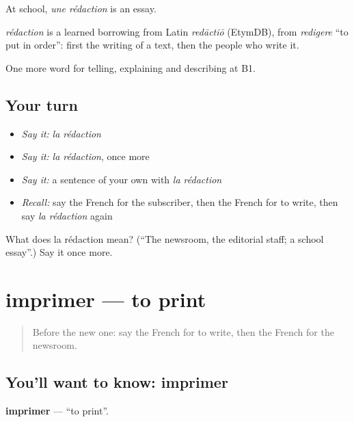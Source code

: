 At school, \emph{une rédaction} is an essay.

\begin{cousinweb}
\emph{rédaction} is a learned borrowing from Latin \emph{redāctiō} (EtymDB), from \emph{redigere} \textquotedblleft{}to put in order\textquotedblright{}: first the writing of a text, then the people who write it.
\end{cousinweb}

\begin{grammarlens}[title={What you've built}]
One more word for telling, explaining and describing at B1.
\end{grammarlens}

\subsection*{Your turn}
\begin{itemize}
\raggedright
  \item \emph{Say it:} \emph{la rédaction}
  \item \emph{Say it:} \emph{la rédaction}, once more
  \item \emph{Say it:} a sentence of your own with \emph{la rédaction}
  \item \emph{Recall:} say the French for the subscriber, then the French for to write, then say \emph{la rédaction} again
\end{itemize}

\begin{tcolorbox}[breakable,colback=teal!4,colframe=teal!35!black,title={Before you move on}]
What does la rédaction mean? (\textquotedblleft{}The newsroom, the editorial staff; a school essay\textquotedblright{}.) Say it once more.
\end{tcolorbox}
\section[imprimer]{imprimer — to print}

\label{lesson:FR-C279-imprimer}



\begin{quote}
Before the new one: say the French for to write, then the French for the newsroom.
\end{quote}

\subsection*{You'll want to know: imprimer}
\textbf{imprimer} — \textquotedblleft{}to print\textquotedblright{}.

